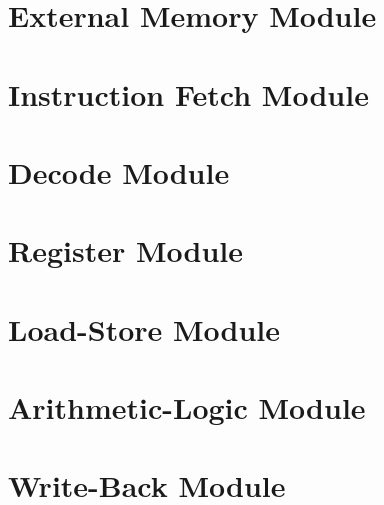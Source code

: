 \newpage

\section{External Memory Module}
\newpage

\section{Instruction Fetch Module}
\newpage

\section{Decode Module}
\newpage

\section{Register Module}
\newpage

\section{Load-Store Module}
\newpage

\section{Arithmetic-Logic Module}
\newpage

\section{Write-Back Module}
\newpage
